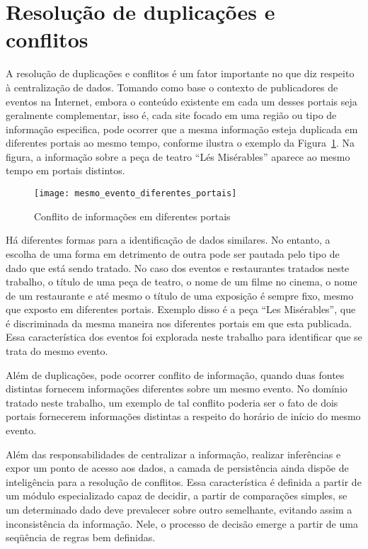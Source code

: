 \section{Resolução de duplicações e conflitos}
\label{sec:resolucao_de_conflitos}

A resolução de duplicações e conflitos é um fator importante no que diz respeito à centralização de dados. Tomando como base o contexto de publicadores de eventos na Internet, embora o conteúdo existente em cada um desses portais seja geralmente complementar, isso é, cada site focado em uma região ou tipo de informação especifica, pode ocorrer que a mesma informação esteja duplicada em diferentes portais ao mesmo tempo, conforme ilustra o exemplo da Figura~\ref{fig:mesmo_evento_diferentes_portais}. Na figura, a informação sobre a peça de teatro ``Lés Misérables'' aparece ao mesmo tempo em portais distintos.

\begin{figure}[!ht]
  \centering
  \texttt{[image: mesmo\_evento\_diferentes\_portais]} 
  \caption{Conflito de informações em diferentes portais}
  \label{fig:mesmo_evento_diferentes_portais} 
\end{figure}

Há diferentes formas para a identificação de dados similares. No entanto, a escolha de uma forma em detrimento de outra pode ser pautada pelo tipo de dado que está sendo tratado. No caso dos eventos e restaurantes tratados neste trabalho, o título de uma peça de teatro, o nome de um filme no cinema, o nome de um restaurante e até mesmo o título de uma exposição é sempre fixo, mesmo que exposto em diferentes portais. Exemplo disso é a peça ``Les Misérables'', que é discriminada da mesma maneira nos diferentes portais em que esta publicada. Essa característica dos eventos foi explorada neste trabalho para identificar que se trata do mesmo evento.

Além de duplicações, pode ocorrer conflito de informação, quando duas fontes distintas fornecem informações diferentes sobre um mesmo evento. No domínio tratado neste trabalho, um exemplo de tal conflito poderia ser o fato de dois portais fornecerem informações distintas a respeito do horário de início do mesmo evento. 

Além das responsabilidades de centralizar a informação, realizar inferências e expor um ponto de acesso aos dados, a camada de persistência ainda dispõe de inteligência para a resolução de conflitos. Essa característica é definida a partir de um módulo especializado capaz de decidir, a partir de comparações simples, se um determinado dado deve prevalecer sobre outro semelhante, evitando assim a inconsistência da informação. Nele, o processo de decisão emerge a partir de uma seqüência de regras bem definidas. 

